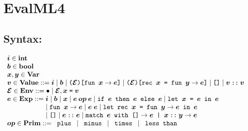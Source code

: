 \documentclass[11pt]{jarticle}
\begin{document}
\EvalNamelessMLiiiDisplayRules

\newpage

\section*{EvalML4}



\subsection*{Syntax:}

\[\begin{array}{l}
\EvalMLivMV{i}[] \in \mathbf{int}\\
\EvalMLivMV{b}[] \in \mathbf{bool}\\
\EvalMLivMV{x}[], \EvalMLivMV{y}[] \in \mathbf{Var}\\
\EvalMLivMV{v}[] \in \mathbf{Value} ::= \EvalMLivMV{i}[]
\mid \EvalMLivMV{b}[] \mid \EvalMLivFunTerm{\EvalMLivMV{env}[]}
{\EvalMLivMV{x}[]}{\EvalMLivMV{e}[]}
\mid \EvalMLivRecTerm{\EvalMLivMV{env}[]}{\EvalMLivMV{x}[]}{\EvalMLivMV{y}[]}
{\EvalMLivMV{e}[]} \mid \EvalMLivNilVTerm
\mid \EvalMLivConsVTerm{\EvalMLivMV{v}[]}
{\EvalMLivMV{v}[]}\\
\EvalMLivMV{env}[] \in \mathbf{Env} ::= \EvalMLivEmptyTerm
\mid \EvalMLivBindTerm{\EvalMLivMV{env}[]}{\EvalMLivMV{x}[]}
{\EvalMLivMV{v}[]}\\
\EvalMLivMV{e}[] \in \mathbf{Exp} ::= \EvalMLivMV{i}[] \mid \EvalMLivMV{b}[]
\mid \EvalMLivMV{x}[] \mid \EvalMLivBinOpTerm{\EvalMLivMV{op}[]}
{\EvalMLivMV{e}[]}{\EvalMLivMV{e}[]} \mid \EvalMLivIfTerm{\EvalMLivMV{e}[]}
{\EvalMLivMV{e}[]}{\EvalMLivMV{e}[]} \mid \EvalMLivLetTerm{\EvalMLivMV{x}[]}
{\EvalMLivMV{e}[]}{\EvalMLivMV{e}[]}  \\ \hspace*{2.0cm}
\mid \EvalMLivAbsTerm{\EvalMLivMV{x}[]}
{\EvalMLivMV{e}[]} \mid \EvalMLivAppTerm{\EvalMLivMV{e}[]}{\EvalMLivMV{e}[]}
\mid \EvalMLivLetRecTerm{\EvalMLivMV{x}[]}{\EvalMLivMV{y}[]}
{\EvalMLivMV{e}[]}{\EvalMLivMV{e}[]}  \\ \hspace*{2.0cm}
\mid \EvalMLivNilTerm
\mid \EvalMLivConsTerm{\EvalMLivMV{e}[]}{\EvalMLivMV{e}[]}
\mid \EvalMLivMatchTerm{\EvalMLivMV{e}[]}{\EvalMLivMV{e}[]}{\EvalMLivMV{x}[]}
{\EvalMLivMV{y}[]}{\EvalMLivMV{e}[]}\\
\EvalMLivMV{op}[] \in \mathbf{Prim} ::= \EvalMLivPlusTerm
\mid \EvalMLivMinusTerm \mid \EvalMLivMultTerm
\mid \EvalMLivLtTerm\\
\end{array}\]
\end{document}
